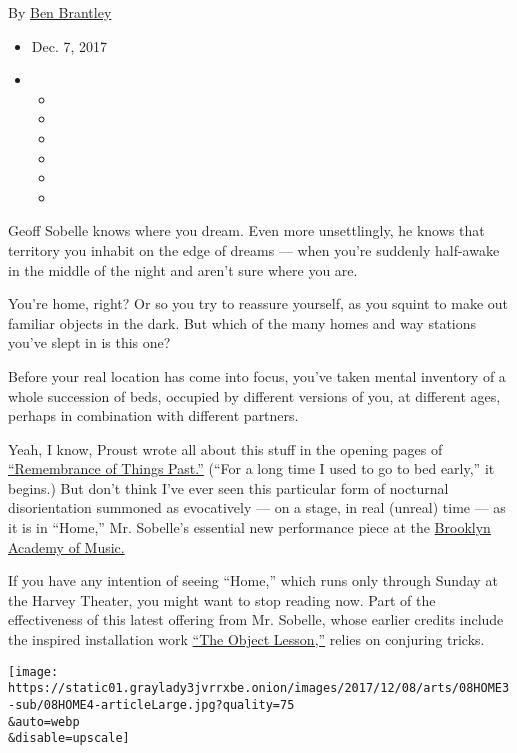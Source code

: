 By \href{http://www.nytimes3xbfgragh.onion/by/ben-brantley}{Ben
Brantley}

\begin{itemize}
\item
  Dec. 7, 2017
\item
  \begin{itemize}
  \item
  \item
  \item
  \item
  \item
  \item
  \end{itemize}
\end{itemize}

Geoff Sobelle knows where you dream. Even more unsettlingly, he knows
that territory you inhabit on the edge of dreams --- when you're
suddenly half-awake in the middle of the night and aren't sure where you
are.

You're home, right? Or so you try to reassure yourself, as you squint to
make out familiar objects in the dark. But which of the many homes and
way stations you've slept in is this one?

Before your real location has come into focus, you've taken mental
inventory of a whole succession of beds, occupied by different versions
of you, at different ages, perhaps in combination with different
partners.

Yeah, I know, Proust wrote all about this stuff in the opening pages of
\href{http://www.authorama.com/remembrance-of-things-past-1.html}{``Remembrance
of Things Past.''} (``For a long time I used to go to bed early,'' it
begins.) But don't think I've ever seen this particular form of
nocturnal disorientation summoned as evocatively --- on a stage, in real
(unreal) time --- as it is in ``Home,'' Mr. Sobelle's essential new
performance piece at the
\href{https://www.bam.org/physical-theater/2017/home}{Brooklyn Academy
of Music.}

If you have any intention of seeing ``Home,'' which runs only through
Sunday at the Harvey Theater, you might want to stop reading now. Part
of the effectiveness of this latest offering from Mr. Sobelle, whose
earlier credits include the inspired installation work
\href{https://www.nytimes3xbfgragh.onion/2014/11/07/theater/geoff-sobelles-the-object-lesson-at-bam.html?_r=0}{``The
Object Lesson,''} relies on conjuring tricks.

\texttt{[image: https://static01.graylady3jvrrxbe.onion/images/2017/12/08/arts/08HOME3-sub/08HOME4-articleLarge.jpg?quality=75\\\&auto=webp\\\&disable=upscale]}


